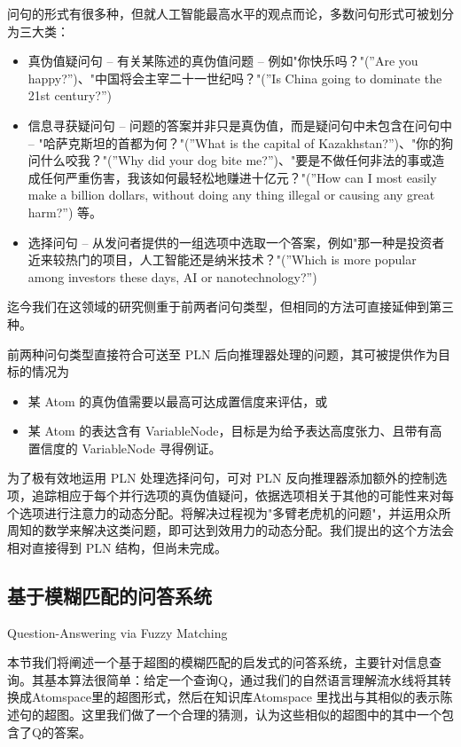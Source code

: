 问句的形式有很多种，但就人工智能最高水平的观点而论，多数问句形式可被划分为三大类：

\begin{itemize}
\item 真伪值疑问句 – 有关某陈述的真伪值问题 – 例如"你快乐吗？"(”Are you happy?”)、"中国将会主宰二十一世纪吗？"(”Is China going to dominate the 21st century?”)
\item 信息寻获疑问句 – 问题的答案并非只是真伪值，而是疑问句中未包含在问句中 – "哈萨克斯坦的首都为何？"(”What is the capital of Kazakhstan?”)、"你的狗问什么咬我？"(”Why did your dog bite me?”)、"要是不做任何非法的事或造成任何严重伤害，我该如何最轻松地赚进十亿元？"(”How can I most easily make a billion dollars, without doing any thing illegal or causing any great harm?”) 等。
\item 选择问句 – 从发问者提供的一组选项中选取一个答案，例如"那一种是投资者近来较热门的项目，人工智能还是纳米技术？"(”Which is more popular among investors these days, AI or nanotechnology?”)
\end{itemize}

迄今我们在这领域的研究侧重于前两者问句类型，但相同的方法可直接延伸到第三种。

前两种问句类型直接符合可送至 PLN 后向推理器处理的问题，其可被提供作为目标的情况为

\begin{itemize}
\item 某 Atom 的真伪值需要以最高可达成置信度来评估，或
\item 某 Atom 的表达含有 VariableNode，目标是为给予表达高度张力、且带有高置信度的 VariableNode 寻得例证。 
\end{itemize}

为了极有效地运用 PLN 处理选择问句，可对 PLN 反向推理器添加额外的控制选项，追踪相应于每个并行选项的真伪值疑问，依据选项相关于其他的可能性来对每个选项进行注意力的动态分配。将解决过程视为"多臂老虎机的问题"，并运用众所周知的数学来解决这类问题，即可达到效用力的动态分配。我们提出的这个方法会相对直接得到 PLN 结构，但尚未完成。


\subsection{基于模糊匹配的问答系统}{Question-Answering via Fuzzy Matching}

本节我们将阐述一个基于超图的模糊匹配的启发式的问答系统，主要针对信息查询。其基本算法很简单：给定一个查询Q，通过我们的自然语言理解流水线将其转换成Atomspace里的超图形式，然后在知识库Atomspace 里找出与其相似的表示陈述句的超图。这里我们做了一个合理的猜测，认为这些相似的超图中的其中一个包含了Q的答案。


